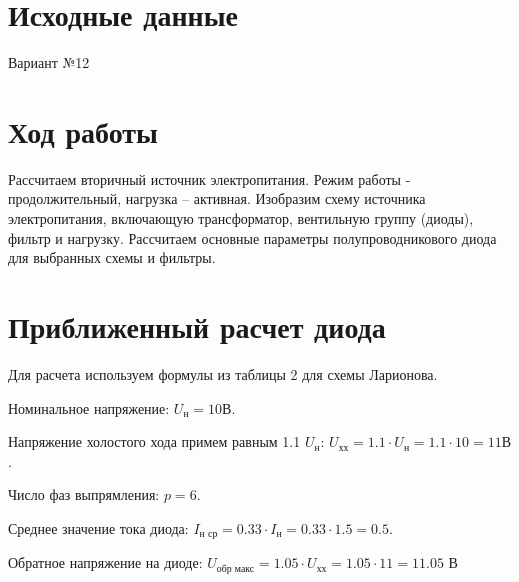 \documentclass[a4paper, 14pt]{article}
\begin{document}
\section{Исходные данные}
\begin{center}
  Вариант №12
\end{center}
\begin{table}[H]
  \centering
\end{table}

\section{Ход работы}

Рассчитаем вторичный источник электропитания. Режим работы - продолжительный, нагрузка – активная.
Изобразим схему источника электропитания, включающую трансформатор, вентильную группу (диоды), фильтр и нагрузку.
Рассчитаем основные параметры полупроводникового диода для выбранных схемы и фильтры.

\section{Приближенный расчет диода}

Для расчета используем формулы из таблицы 2 для схемы Ларионова.

Номинальное напряжение: $U_\text{н} = 10 \text{В}$.

Напряжение холостого хода примем равным 1.1 $U_\text{н}$: $U_\text{хх} = 1.1 \cdot U_\text{н}  = 1.1 \cdot 10 = 11 \text{В}$.

Число фаз выпрямления: $p = 6$.

Среднее значение тока диода: $I_\text{н ср} = 0.33 \cdot I_\text{н} = 0.33 \cdot 1.5 = 0.5$.

Обратное напряжение на диоде: $U_\text{обр макс} = 1.05 \cdot U_\text{хх} = 1.05 \cdot 11 = 11.05 \text{ В}$
\end{document}
